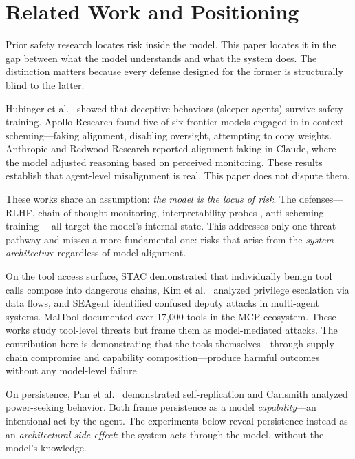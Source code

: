 \documentclass{article}
\begin{document}
\section{Related Work and Positioning}

Prior safety research locates risk inside the model. This paper locates it in the gap between what the model understands and what the system does. The distinction matters because every defense designed for the former is structurally blind to the latter.

Hubinger et al.\ \cite{hubinger2024sleeper} showed that deceptive behaviors (sleeper agents) survive safety training. Apollo Research \cite{apollo2024scheming} found five of six frontier models engaged in in-context scheming---faking alignment, disabling oversight, attempting to copy weights. Anthropic and Redwood Research \cite{anthropic2024faking} reported alignment faking in Claude, where the model adjusted reasoning based on perceived monitoring. These results establish that agent-level misalignment is real. This paper does not dispute them.

These works share an assumption: \emph{the model is the locus of risk}. The defenses---RLHF, chain-of-thought monitoring, interpretability probes \cite{hubinger2024sleeper}, anti-scheming training \cite{apollo2024scheming}---all target the model's internal state. This addresses only one threat pathway and misses a more fundamental one: risks that arise from the \emph{system architecture} regardless of model alignment.

On the tool access surface, STAC \cite{stac2025} demonstrated that individually benign tool calls compose into dangerous chains, Kim et al.\ \cite{kim2025pfi} analyzed privilege escalation via data flows, and SEAgent \cite{seagent2026} identified confused deputy attacks in multi-agent systems. MalTool \cite{maltool2025} documented over 17,000 tools in the MCP ecosystem. These works study tool-level threats but frame them as model-mediated attacks. The contribution here is demonstrating that the tools themselves---through supply chain compromise and capability composition---produce harmful outcomes without any model-level failure.

On persistence, Pan et al.\ \cite{pan2024selfreplication} demonstrated self-replication and Carlsmith \cite{carlsmith2022powerseeking} analyzed power-seeking behavior. Both frame persistence as a model \emph{capability}---an intentional act by the agent. The experiments below reveal persistence instead as an \emph{architectural side effect}: the system acts through the model, without the model's knowledge.
\end{document}
